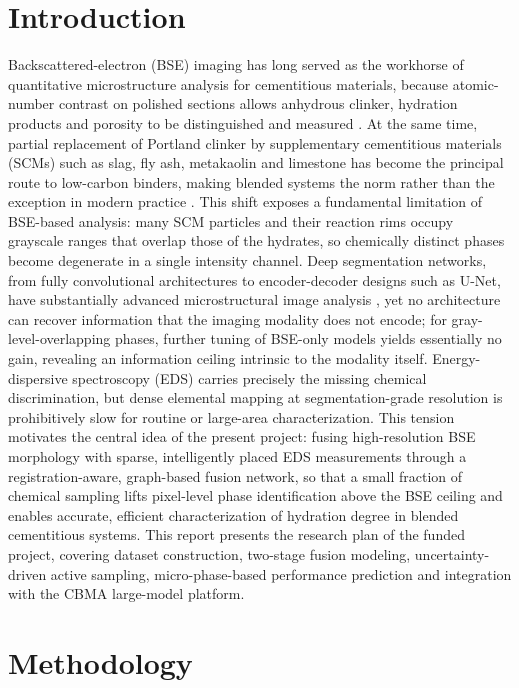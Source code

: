 \documentclass[11pt,a4paper]{article}
\begin{document}
\section{Introduction}

Backscattered-electron (BSE) imaging has long served as the workhorse of quantitative microstructure analysis for cementitious materials, because atomic-number contrast on polished sections allows anhydrous clinker, hydration products and porosity to be distinguished and measured \citep{scrivener2004}. At the same time, partial replacement of Portland clinker by supplementary cementitious materials (SCMs) such as slag, fly ash, metakaolin and limestone has become the principal route to low-carbon binders, making blended systems the norm rather than the exception in modern practice \citep{lothenbach2011,juenger2015}. This shift exposes a fundamental limitation of BSE-based analysis: many SCM particles and their reaction rims occupy grayscale ranges that overlap those of the hydrates, so chemically distinct phases become degenerate in a single intensity channel. Deep segmentation networks, from fully convolutional architectures to encoder-decoder designs such as U-Net, have substantially advanced microstructural image analysis \citep{long2015,ronneberger2015}, yet no architecture can recover information that the imaging modality does not encode; for gray-level-overlapping phases, further tuning of BSE-only models yields essentially no gain, revealing an information ceiling intrinsic to the modality itself. Energy-dispersive spectroscopy (EDS) carries precisely the missing chemical discrimination, but dense elemental mapping at segmentation-grade resolution is prohibitively slow for routine or large-area characterization. This tension motivates the central idea of the present project: fusing high-resolution BSE morphology with sparse, intelligently placed EDS measurements through a registration-aware, graph-based fusion network, so that a small fraction of chemical sampling lifts pixel-level phase identification above the BSE ceiling and enables accurate, efficient characterization of hydration degree in blended cementitious systems. This report presents the research plan of the funded project, covering dataset construction, two-stage fusion modeling, uncertainty-driven active sampling, micro-phase-based performance prediction and integration with the CBMA large-model platform.

\section{Methodology}
\end{document}
